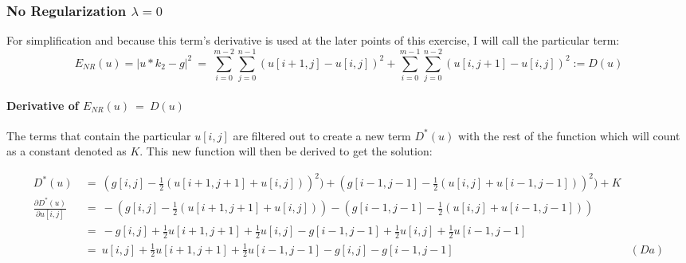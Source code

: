 \documentclass{report}
\begin{document}
			\subsubsection{No Regularization $\lambda = 0$}
			\startsubsection
				For simplification and because this term's derivative is used at the later points of this exercise, I will call the particular term:
				\vspace{-0.4cm}
				\[
					E_{NR}(u) = | u \ast k_2 - g | ^2 \ = \ \sum_{i=0}^{m-2} \sum_{j=0}^{n-1} ( u[i+1,j] - u[i,j] )^2 + \sum_{i=0}^{m-1} \sum_{j=0}^{n-2} ( u[i,j+1] - u[i,j] )^2 := D(u)
				\]
				\vspace{-0.8cm} \paragraph{Derivative of  $E_{NR}(u) \ = \ D(u)$}
				\startsubsection
					The terms that contain the particular $u[i,j]$ are filtered out to create a new term $D^*(u)$ with the rest of the function which will count as a constant denoted as $K$. This new function will then be derived to get the solution:
					\begin{adjustwidth}{-4em}{}
					\vspace{-0.5cm}
						\begin{align*}
							D^*(u) \ & = \ (g[i,j] - \frac{1}{2} (u[i+1,j+1] + u[i,j]))^2) + (g[i-1,j-1] - \frac{1}{2} (u[i,j] + u[i-1,j-1]))^2) + K \\
							\frac{\partial D^*(u)}{\partial u[i,j]} \ & = \ - (g[i,j] - \frac{1}{2} (u[i+1,j+1] + u[i,j])) - (g[i-1,j-1] - \frac{1}{2} (u[i,j] + u[i-1,j-1])) \\
							& = \ - g[i,j] + \frac{1}{2} u[i+1,j+1] + \frac{1}{2} u[i,j] - g[i-1,j-1] + \frac{1}{2} u[i,j] + \frac{1}{2} u[i-1,j-1] \\
							& = \ u[i,j]  + \frac{1}{2} u[i+1,j+1] + \frac{1}{2} u[i-1,j-1] - g[i,j] - g[i-1,j-1] & (Da)
						\end{align*}
					\end{adjustwidth}
				\closesection
			\closesection
\end{document}

